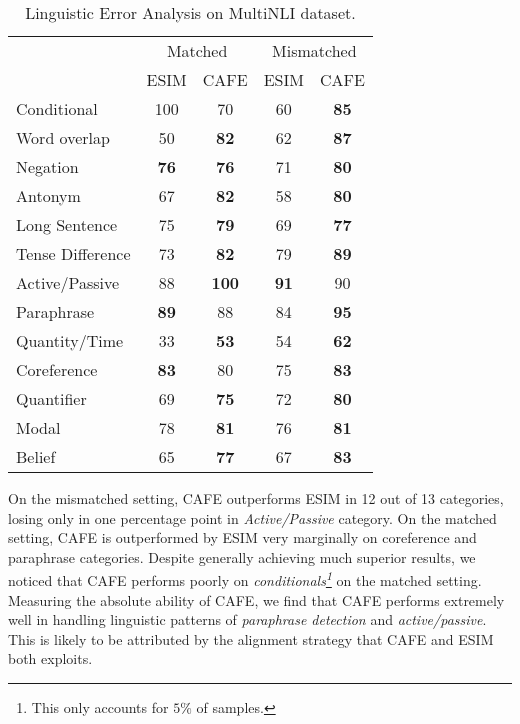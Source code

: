 \documentclass[11pt,a4paper]{article}
\begin{document}
\begin{table}[htbp]
  \centering
  \small

    \begin{tabular}{|l|cccc|}
    \hline
          & \multicolumn{2}{c}{Matched}        & \multicolumn{2}{c|}{Mismatched}  \\

          & \multicolumn{1}{c}{ESIM} & \multicolumn{1}{c}{CAFE} & \multicolumn{1}{c}{ESIM} & \multicolumn{1}{c|}{CAFE} \\
          \hline
    Conditional & 100   & 70    & 60    & \textbf{85} \\
    Word overlap & 50    & \textbf{82} & 62    & \textbf{87} \\
    Negation & \textbf{76}    & \textbf{76}    & 71    & \textbf{80} \\
    Antonym & 67    & \textbf{82} & 58    & \textbf{80} \\
    Long Sentence & 75    & \textbf{79} & 69    & \textbf{77} \\
    Tense Difference & 73    & \textbf{82} & 79    & \textbf{89} \\
    Active/Passive & 88    & \textbf{100} & \textbf{91}    & 90 \\
    Paraphrase & \textbf{89}    & 88    & 84    & \textbf{95} \\
    Quantity/Time  & 33    & \textbf{53} & 54    & \textbf{62} \\
    Coreference & \textbf{83}    & 80    & 75    & \textbf{83} \\
    Quantifier & 69    & \textbf{75} & 72    & \textbf{80} \\
    Modal & 78    & \textbf{81} & 76    & \textbf{81} \\
    Belief & 65    & \textbf{77} & 67    & \textbf{83} \\
    \hline
    \end{tabular}\caption{Linguistic Error Analysis on MultiNLI dataset. }
  \label{tab:error}\end{table}

On the mismatched setting, CAFE outperforms ESIM in 12 out of 13 categories, losing only in one percentage point in \textit{Active/Passive} category. On the matched setting, CAFE is outperformed by ESIM very marginally on coreference and paraphrase categories. Despite generally achieving much superior results, we noticed that CAFE performs poorly on \textit{conditionals\footnote{This only accounts for $5\%$ of samples.}} on the matched setting. Measuring the absolute ability of CAFE, we find that CAFE performs extremely well in handling linguistic patterns of \textit{paraphrase detection} and \textit{active/passive}. This is likely to be attributed by the alignment strategy that CAFE and ESIM both exploits.
\end{document}
